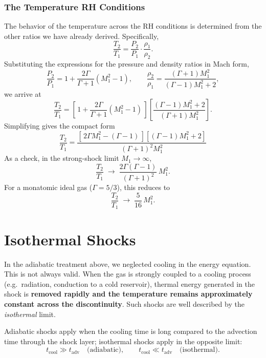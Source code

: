 \subsubsection*{The Temperature RH Conditions}

The behavior of the temperature across the RH conditions is determined from the
other ratios we have already derived. Specifically,
\[
\frac{T_2}{T_1} = \frac{P_2}{P_1} \cdot \frac{\rho_1}{\rho_2}.
\]
Substituting the expressions for the pressure and density ratios in Mach form,
\[
\frac{P_2}{P_1} = 1 + \frac{2\Gamma}{\Gamma+1}\left(M_1^2 - 1\right),
\qquad
\frac{\rho_2}{\rho_1} = \frac{(\Gamma+1)M_1^2}{(\Gamma-1)M_1^2+2},
\]
we arrive at
\[
\frac{T_2}{T_1} =
\left[\,1 + \frac{2\Gamma}{\Gamma+1}\left(M_1^2 - 1\right)\,\right]
\left[\frac{(\Gamma-1)M_1^2+2}{(\Gamma+1)M_1^2}\right].
\]
Simplifying gives the compact form
\begin{equation}
\boxed{\;\;
\frac{T_2}{T_1} =
\frac{\left[\,2\Gamma M_1^2 - (\Gamma - 1)\,\right]
      \left[(\Gamma-1)M_1^2+2\right]}
     {(\Gamma+1)^2 M_1^2}
\;\;}
\end{equation}
\noindent
As a check, in the strong-shock limit $M_1 \to \infty$,
\[
\frac{T_2}{T_1} \;\longrightarrow\;
\frac{2\Gamma(\Gamma-1)}{(\Gamma+1)^2}\,M_1^2.
\]
For a monatomic ideal gas ($\Gamma=5/3$), this reduces to
\[
\frac{T_2}{T_1} \;\longrightarrow\; \frac{5}{16}\,M_1^2.
\]

\section{Isothermal Shocks}

In the adiabatic treatment above, we neglected cooling in the energy equation. This is not always valid. When the gas is strongly coupled to a cooling process (e.g.\ radiation, conduction to a cold reservoir), thermal energy generated in the shock is \textbf{removed rapidly and the temperature remains approximately constant across the discontinuity}. Such shocks are well described by the \emph{isothermal} limit.

\begin{remark}
Adiabatic shocks apply when the cooling time is long compared to the advection time through the shock layer; isothermal shocks apply in the opposite limit:
\[
t_{\mathrm{cool}} \gg t_{\mathrm{adv}} \quad \text{(adiabatic)}, 
\qquad
t_{\mathrm{cool}} \ll t_{\mathrm{adv}} \quad \text{(isothermal)}.
\]
\end{remark}

